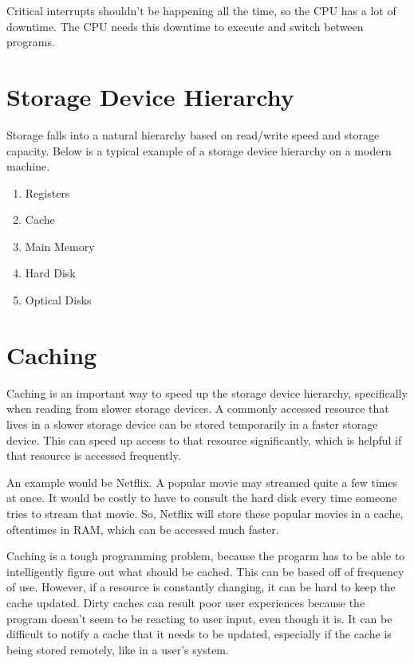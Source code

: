 \documentclass{article}
\begin{document}
Critical interrupts shouldn't be happening all the time, so the CPU has a lot
of downtime. The CPU needs this downtime to execute and switch between
programs.

\section{Storage Device Hierarchy}

Storage falls into a natural hierarchy based on read/write speed and storage
capacity. Below is a typical example of a storage device hierarchy on a modern
machine.

\begin{enumerate}
	\item Registers
	\item Cache
	\item Main Memory
	\item Hard Disk
	\item Optical Disks
\end{enumerate}

\section{Caching}

Caching is an important way to speed up the storage device hierarchy,
specifically when reading from slower storage devices. A commonly accessed
resource that lives in a slower storage device can be stored temporarily in a
faster storage device. This can speed up access to that resource significantly,
which is helpful if that resource is accessed frequently.

An example would be Netflix. A popular movie may streamed quite a few times at
once. It would be costly to have to consult the hard disk every time someone
tries to stream that movie. So, Netflix will store these popular movies in a
cache, oftentimes in RAM, which can be accessed much faster.

Caching is a tough programming problem, because the progarm has to be able to
intelligently figure out what should be cached. This can be based off of
frequency of use. However, if a resource is constantly changing, it can be hard
to keep the cache updated. Dirty caches can result poor user experiences
because the program doesn't seem to be reacting to user input, even though it
is. It can be difficult to notify a cache that it needs to be updated,
especially if the cache is being stored remotely, like in a user's system.
\end{document}
